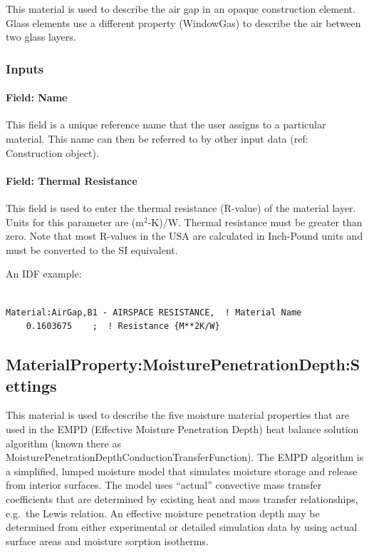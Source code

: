 This material is used to describe the air gap in an opaque construction element. Glass elements use a different property (WindowGas) to describe the air between two glass layers.

\subsubsection{Inputs}\label{inputs-3-036}

\paragraph{Field: Name}\label{field-name-3-031}

This field is a unique reference name that the user assigns to a particular material. This name can then be referred to by other input data (ref: Construction object).

\paragraph{Field: Thermal Resistance}\label{field-thermal-resistance-1}

This field is used to enter the thermal resistance (R-value) of the material layer. Units for this parameter are (m\(^{2}\)-K)/W. Thermal resistance must be greater than zero. Note that most R-values in the USA are calculated in Inch-Pound units and must be converted to the SI equivalent.

An IDF example:

\begin{lstlisting}

Material:AirGap,B1 - AIRSPACE RESISTANCE,  ! Material Name
    0.1603675    ;  ! Resistance {M**2K/W}
\end{lstlisting}

\subsection{MaterialProperty:MoisturePenetrationDepth:Settings}\label{materialpropertymoisturepenetrationdepthsettings}

This material is used to describe the five moisture material properties that are used in the EMPD (Effective Moisture Penetration Depth) heat balance solution algorithm (known there as MoisturePenetrationDepthConductionTransferFunction). The EMPD algorithm is a simplified, lumped moisture model that simulates moisture storage and release from interior surfaces. The model uses ``actual'' convective mass transfer coefficients that are determined by existing heat and mass transfer relationships, e.g.~the Lewis relation. An effective moisture penetration depth may be determined from either experimental or detailed simulation data by using actual surface areas and moisture sorption isotherms.

